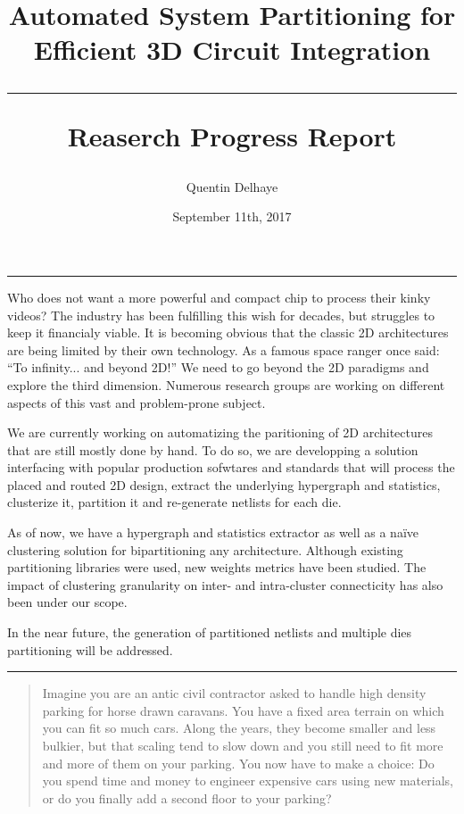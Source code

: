 \documentclass[11pt,a4paper]{article}
\author{Quentin Delhaye}
\date{September 11th, 2017}
\title{Automated System Partitioning for Efficient 3D Circuit Integration \\ \vspace{.5em} \hrule \vspace{.5em} \large Reaserch Progress Report}
\theoremstyle{customdef}
\renewenvironment{abstract}{%
\begin{center}\begin{minipage}{0.85\textwidth}
\rule{\textwidth}{1pt}}
{\par\noindent\rule{\textwidth}{1pt}\end{minipage}\end{center}}
\begin{document}

\maketitle

\vspace{5cm}

\begin{abstract}
Who does not want a more powerful and compact chip to process their kinky videos?
The industry has been fulfilling this wish for decades, but struggles to keep it financialy viable.
It is becoming obvious that the classic 2D architectures are being limited by their own technology.
As a famous space ranger once said: “To infinity... and beyond 2D!”
We need to go beyond the 2D paradigms and explore the third dimension.
Numerous research groups are working on different aspects of this vast and problem-prone subject.

We are currently working on automatizing the paritioning of 2D architectures that are still mostly done by hand.
To do so, we are developping a solution interfacing with popular production sofwtares and standards that will process the placed and routed 2D design, extract the underlying hypergraph and statistics, clusterize it, partition it and re-generate netlists for each die.

As of now, we have a hypergraph and statistics extractor as well as a naïve clustering solution for bipartitioning any architecture.
Although existing partitioning libraries were used, new weights metrics have been studied.
The impact of clustering granularity on inter- and intra-cluster connecticity has also been under our scope.

In the near future, the generation of partitioned netlists and multiple dies partitioning will be addressed.
\end{abstract}

\clearpage

\tableofcontents

\clearpage


\printglossaries

\clearpage


\begin{quote}
Imagine you are an antic civil contractor asked to handle high density parking for horse drawn caravans.
You have a fixed area terrain on which you can fit so much cars.
Along the years, they become smaller and less bulkier, but that scaling tend to slow down and you still need to fit more and more of them on your parking.
You now have to make a choice: Do you spend time and money to engineer expensive cars using new materials, or do you finally add a second floor to your parking?
\end{quote}
\end{document}
